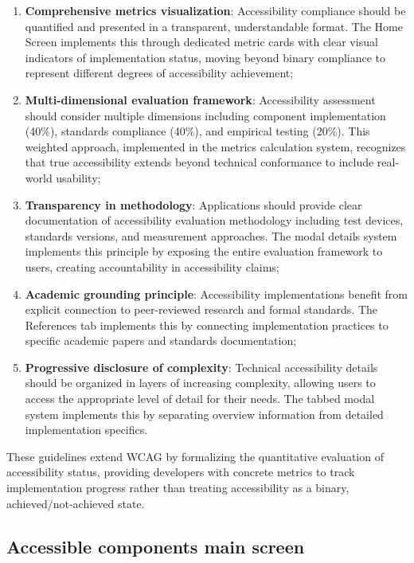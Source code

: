 \begin{enumerate}
    \item \textbf{Comprehensive metrics visualization}: Accessibility compliance should be quantified and presented in a transparent, understandable format. The Home Screen implements this through dedicated metric cards with clear visual indicators of implementation status, moving beyond binary compliance to represent different degrees of accessibility achievement;
    
    \item \textbf{Multi-dimensional evaluation framework}: Accessibility assessment should consider multiple dimensions including component implementation (40\%), standards compliance (40\%), and empirical testing (20\%). This weighted approach, implemented in the metrics calculation system, recognizes that true accessibility extends beyond technical conformance to include real-world usability;
    
    \item \textbf{Transparency in methodology}: Applications should provide clear documentation of accessibility evaluation methodology including test devices, standards versions, and measurement approaches. The modal details system implements this principle by exposing the entire evaluation framework to users, creating accountability in accessibility claims;
    
    \item \textbf{Academic grounding principle}: Accessibility implementations benefit from explicit connection to peer-reviewed research and formal standards. The References tab implements this by connecting implementation practices to specific academic papers and standards documentation;
    
    \item \textbf{Progressive disclosure of complexity}: Technical accessibility details should be organized in layers of increasing complexity, allowing users to access the appropriate level of detail for their needs. The tabbed modal system implements this by separating overview information from detailed implementation specifics.
\end{enumerate}

These guidelines extend WCAG by formalizing the quantitative evaluation of accessibility status, providing developers with concrete metrics to track implementation progress rather than treating accessibility as a binary, achieved/not-achieved state.

\subsection{Accessible components main screen}

